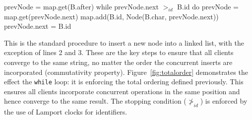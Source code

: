 \documentclass[12pt,a4paper,twoside,openright]{report}
\begin{document}
\begin{typescript}
 prevNode = map.get(B.after)
 while prevNode.next $>_{id}$ B.id do
   prevNode = map.get(prevNode.next)
 map.add(B.id, Node(B.char, prevNode.next))
 prevNode.next = B.id
\end{typescript}
				
				This is the standard procedure to insert a new node into a linked list, with the exception of lines 2 and 3. These are the key steps to ensure that all clients converge to the same string, no matter the order the concurrent inserts are incorporated (commutativity property). Figure~\ref{fig:totalorder} demonstrates the effect the \texttt{while} loop: it is enforcing the total ordering defined previously. This ensures all clients incorporate concurrent operations in the same position and hence converge to the same result. The stopping condition ($\not >_{id}$) is enforced by the use of Lamport clocks for identifiers.
				
\end{document}
